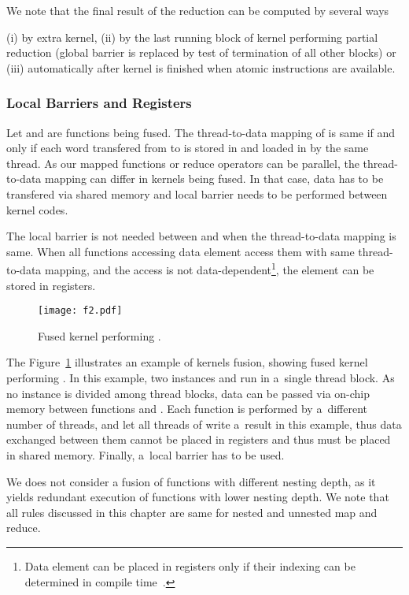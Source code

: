 \documentclass[final]{siamltex}
\begin{document}
We note that the final result of the reduction can be computed by several ways{ (i) by extra kernel, (ii) by the last running block of kernel performing partial reduction (global barrier is replaced by test of termination of all other blocks) or (iii) automatically after kernel is finished when atomic instructions are available.

\subsubsection{Local Barriers and Registers}

Let  and  are functions being fused. The thread-to-data mapping of  is same if and only if each word transfered from  to  is stored in  and loaded in  by the same thread. As our mapped functions or reduce operators can be parallel, the thread-to-data mapping can differ in kernels being fused. In that case, data has to be transfered via shared memory and local barrier needs to be performed between kernel codes. 

The local barrier is not needed between  and  when the thread-to-data mapping is same. When all functions accessing data element  access them with same thread-to-data mapping, and the access is not data-dependent\footnote{Data element can be placed in registers only if their indexing can be determined in compile time~\cite{nvidia2011nvidia}.}, the element  can be stored in registers.

\begin{figure}[h]
\centering
\texttt{[image: f2.pdf]}
\caption{Fused kernel performing .}
\label{fig:map-ilustration}
\end{figure}

The Figure~\ref{fig:map-ilustration} illustrates an example of kernels fusion, showing fused kernel performing . In this example, two instances  and  run in a~single thread block. As no instance is divided among thread blocks, data can be passed via on-chip memory between functions  and . Each function is performed by a~different number of threads, and let all threads of  write a~result in this example, thus data exchanged between them cannot be placed in registers and thus must be placed in shared memory. Finally, a~local barrier has to be used.

We does not consider a fusion of functions with different nesting depth, as it yields redundant execution of functions with lower nesting depth. We note that all rules discussed in this chapter are same for nested and unnested map and reduce.

}
\end{document}

